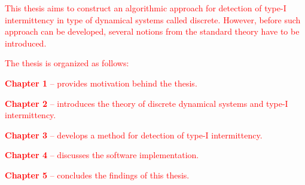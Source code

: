 

\bigskip

\textcolor{red}{
This thesis aims to construct an algorithmic approach for detection of type-I intermittency in type of dynamical systems called discrete.
However, before such approach can be developed, several notions from the standard theory have to be introduced.
}
\par
\textcolor{red}{
The thesis is organized as follows:
}
\textcolor{red}{
\begin{description}
	\item \textbf{Chapter 1} -- provides motivation behind the thesis.
	\item \textbf{Chapter 2} -- introduces the theory of discrete dynamical systems and type-I intermittency.
	\item \textbf{Chapter 3} -- develops a method for detection of type-I intermittency.
	\item \textbf{Chapter 4} -- discusses the software implementation.
	\item \textbf{Chapter 5} -- concludes the findings of this thesis.
\end{description}
}

\endinput